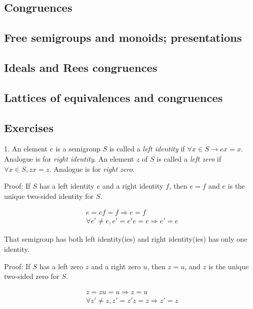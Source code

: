 \subsection[5]{Congruences}
\subsection[6]{Free semigroups and monoids; presentations}
\subsection[7]{Ideals and Rees congruences}
\subsection[8]{Lattices of equivalences and congruences}
\subsection[9]{Exercises}
1. An element $e$ is a semigroup $S$ is called a \emph{left identity} if $\forall x \in S\rightarrow ex = x$. Analogue is for \emph{right identity}.
An element $z$ of $S$ is called a \emph{left zero} if $\forall x \in S, zx=z$. Analogue is for \emph{right zero}.

Proof: If $S$ has a left identity $e$ and a right identity $f$, then $e=f$ and $e$ is the unique two-sided identity for $S$.
\begin{Prof}
    \begin{align*}
        e=ef=f \Rightarrow e=f  \\
        \forall e' \neq e, e' = e'e = e \Rightarrow e'=e
    \end{align*}
\end{Prof}
That semigroup has both left identity(ies) and right identity(ies) has only one identity.


Proof: If $S$ has a left zero $z$ and a right zero $u$, then $z=u$, and $z$ is the unique two-sided zero for $S$.
\begin{Prof}
    \begin{align*}
        z=zu=u \Rightarrow z=u  \\
        \forall z'\neq z, z' = z'z = z \Rightarrow z'=z
    \end{align*}
\end{Prof}

